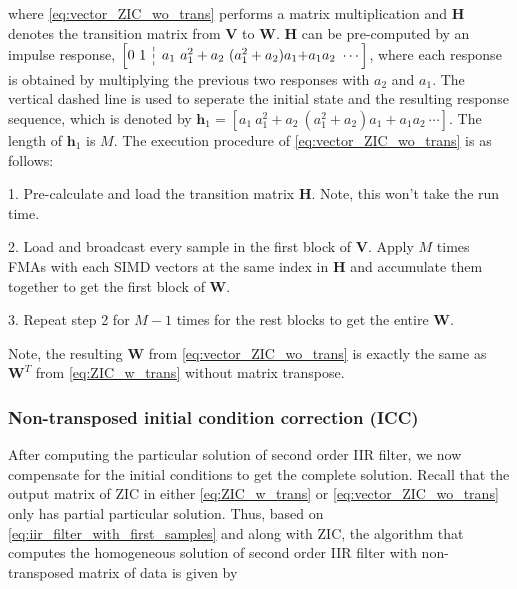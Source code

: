 where \eqref{eq:vector_ZIC_wo_trans} performs a matrix multiplication and $\bm{H}$ denotes
the transition matrix from $\bm{V}$ to $\bm{W}$. $\bm{H}$ can be pre-computed
by an impulse response, $\left[0 ~ 1~ \dashline ~ a_1 ~ a_1^2+a_2 ~ (a_1^2+a_2)a_1{+}a_1a_2~\cdots\right]$,
where each response is obtained by multiplying the previous two responses with $a_2$ and $a_1$.
The vertical dashed line is used to seperate the initial state and the resulting response sequence,
which is denoted by $\bm{h}_1 = \left[a_1 ~ a_1^2+a_2 ~ (a_1^2+a_2)a_1{+}a_1a_2~\cdots\right]$.
The length of $\bm{h}_1$ is $M$.
The execution procedure of \eqref{eq:vector_ZIC_wo_trans} is as follows:

1. Pre-calculate and load the transition matrix $\bm{H}$. Note, this won't take the run time.

2. Load and broadcast every sample in the first block of $\bm{V}$. Apply $M$ times FMAs with each SIMD vectors at the same index in $\bm{H}$
and accumulate them together to get the first block of $\bm{W}$.

3. Repeat step 2 for $M{-}1$ times for the rest blocks to get the entire $\bm{W}$.

Note, the resulting $\bm{W}$ from \eqref{eq:vector_ZIC_wo_trans} is exactly the same as 
$\bm{W}^T$ from \eqref{eq:ZIC_w_trans} without matrix transpose.

\subsubsection{Non-transposed initial condition correction (ICC)}

After computing the particular solution of second order IIR filter, we now compensate for the 
initial conditions to get the complete solution. Recall that the output matrix of ZIC in either \eqref{eq:ZIC_w_trans} or
\eqref{eq:vector_ZIC_wo_trans} only has partial particular solution. Thus, based on \eqref{eq:iir_filter_with_first_samples} and along with ZIC,
the algorithm that computes the homogeneous solution of second order
IIR filter with non-transposed matrix of data is given by 

